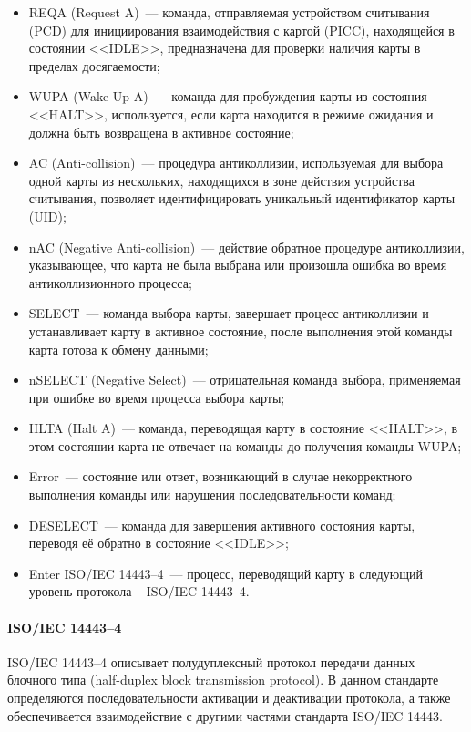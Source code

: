 \begin{itemize}
    \item REQA (Request A)~--- команда, отправляемая устройством считывания (PCD) для инициирования взаимодействия с картой (PICC), находящейся в состоянии <<IDLE>>, предназначена для проверки наличия карты в пределах досягаемости;
    \item WUPA (Wake-Up A)~--- команда для пробуждения карты из состояния <<HALT>>, используется, если карта находится в режиме ожидания и должна быть возвращена в активное состояние;
    \item AC (Anti-collision)~--- процедура антиколлизии, используемая для выбора одной карты из нескольких, находящихся в зоне действия устройства считывания, позволяет идентифицировать уникальный идентификатор карты (UID);
    \item nAC (Negative Anti-collision)~--- действие обратное процедуре антиколлизии, указывающее, что карта не была выбрана или произошла ошибка во время антиколлизионного процесса;
    \item SELECT~--- команда выбора карты, завершает процесс антиколлизии и устанавливает карту в активное состояние, после выполнения этой команды карта готова к обмену данными;
    \item nSELECT (Negative Select)~--- отрицательная команда выбора, применяемая при ошибке во время процесса выбора карты;
    \item HLTA (Halt A)~--- команда, переводящая карту в состояние <<HALT>>, в этом состоянии карта не отвечает на команды до получения команды WUPA;
    \item Error~--- состояние или ответ, возникающий в случае некорректного выполнения команды или нарушения последовательности команд;
    \item DESELECT~--- команда для завершения активного состояния карты, переводя её обратно в состояние <<IDLE>>;
    \item Enter ISO/IEC 14443--4~--- процесс, переводящий карту в следующий уровень протокола -- ISO/IEC 14443--4.
\end{itemize}


\paragraph{ISO/IEC 14443--4}

ISO/IEC 14443--4 описывает полудуплексный протокол передачи данных блочного типа (half-duplex block transmission protocol).
В данном стандарте определяются последовательности активации и деактивации протокола, а также обеспечивается взаимодействие с другими частями стандарта ISO/IEC 14443.

